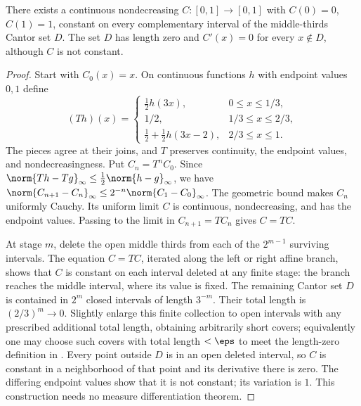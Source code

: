 \begin{construction}
There exists a continuous nondecreasing $C:[0,1]\to[0,1]$ with $C(0)=0$, $C(1)=1$, constant on every complementary interval of the middle-thirds Cantor set $D$. The set $D$ has length zero and $C'(x)=0$ for every $x\notin D$, although $C$ is not constant.
\end{construction}
\begin{proof}
Start with $C_0(x)=x$. On continuous functions $h$ with endpoint values $0,1$ define
\[(Th)(x)=\begin{cases}\tfrac12h(3x),&0\leq x\leq1/3,\\1/2,&1/3\leq x\leq2/3,\\\tfrac12+\tfrac12h(3x-2),&2/3\leq x\leq1.\end{cases}\]
The pieces agree at their joins, and $T$ preserves continuity, the endpoint values, and nondecreasingness. Put $C_n=T^nC_0$. Since $\norm{Th-Tg}_\infty\leq\frac12\norm{h-g}_\infty$, we have $\norm{C_{n+1}-C_n}_\infty\leq2^{-n}\norm{C_1-C_0}_\infty$. The geometric bound makes $C_n$ uniformly Cauchy. Its uniform limit $C$ is continuous, nondecreasing, and has the endpoint values. Passing to the limit in $C_{n+1}=TC_n$ gives $C=TC$.

At stage $m$, delete the open middle thirds from each of the $2^{m-1}$ surviving intervals. The equation $C=TC$, iterated along the left or right affine branch, shows that $C$ is constant on each interval deleted at any finite stage: the branch reaches the middle interval, where its value is fixed. The remaining Cantor set $D$ is contained in $2^m$ closed intervals of length $3^{-m}$. Their total length is $(2/3)^m\to0$. Slightly enlarge this finite collection to open intervals with any prescribed additional total length, obtaining arbitrarily short covers; equivalently one may choose such covers with total length $<\eps$ to meet the length-zero definition in . Every point outside $D$ is in an open deleted interval, so $C$ is constant in a neighborhood of that point and its derivative there is zero. The differing endpoint values show that it is not constant; its variation is $1$. This construction needs no measure differentiation theorem.
\end{proof}


